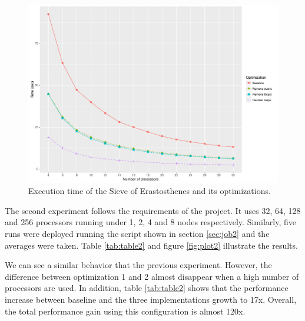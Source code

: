 \documentclass[10pt]{scrartcl}
\begin{document}
\begin{figure}[ht]
  \centering
  \includegraphics[width=\textwidth]{plot}
  \caption{Execution time of the Sieve of Erastosthenes and its optimizations.}\label{fig:plot}
\end{figure}

The second experiment follows the requirements of the project.  It uses 32, 64, 128 and 256 processors running under 1, 2, 4 and 8 nodes respectively.  Similarly, five runs were deployed running the script shown in section \ref{sec:job2} and the averages were taken.  Table \ref{tab:table2} and figure \ref{fig:plot2} illustrate the results.  

We can see a similar behavior that the previous experiment.  However, the difference between optimization 1 and 2 almost disappear when a high number of processors are used.  In addition, table \ref{tab:table2} shows that the performance increase between baseline and the three implementations growth to 17x.  Overall, the total performance gain using this configuration is almost 120x.
\end{document}
